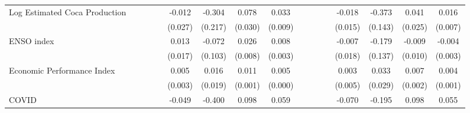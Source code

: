\begin{tabular}{lcccccccccccccccc}
\addlinespace
Log Estimated Coca Production&                     &                     &                     &                     &      -0.012         &      -0.304         &       0.078\sym{**} &       0.033\sym{**} &                     &                     &                     &                     &      -0.018         &      -0.373\sym{**} &       0.041         &       0.016\sym{**} \\
                    &                     &                     &                     &                     &     (0.027)         &     (0.217)         &     (0.030)         &     (0.009)         &                     &                     &                     &                     &     (0.015)         &     (0.143)         &     (0.025)         &     (0.007)         \\
\addlinespace
ENSO index          &                     &                     &                     &                     &       0.013         &      -0.072         &       0.026\sym{**} &       0.008\sym{**} &                     &                     &                     &                     &      -0.007         &      -0.179         &      -0.009         &      -0.004         \\
                    &                     &                     &                     &                     &     (0.017)         &     (0.103)         &     (0.008)         &     (0.003)         &                     &                     &                     &                     &     (0.018)         &     (0.137)         &     (0.010)         &     (0.003)         \\
\addlinespace
Economic Performance Index&                     &                     &                     &                     &       0.005         &       0.016         &       0.011\sym{***}&       0.005\sym{***}&                     &                     &                     &                     &       0.003         &       0.033         &       0.007\sym{**} &       0.004\sym{***}\\
                    &                     &                     &                     &                     &     (0.003)         &     (0.019)         &     (0.001)         &     (0.000)         &                     &                     &                     &                     &     (0.005)         &     (0.029)         &     (0.002)         &     (0.001)         \\
\addlinespace
COVID               &                     &                     &                     &                     &      -0.049         &      -0.400         &       0.098\sym{**} &       0.059\sym{***}&                     &                     &                     &                     &      -0.070         &      -0.195         &       0.098\sym{**} &       0.055\sym{**} \\

\end{tabular}
